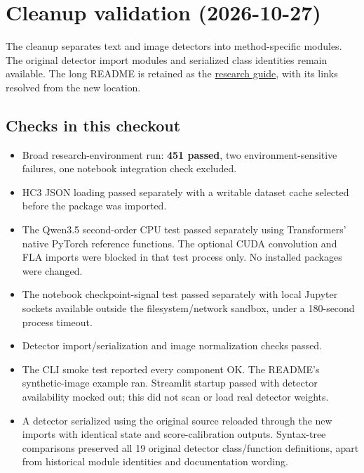 \section{Cleanup validation
(2026-10-27)}\label{record-docs-cleanup-validation-md-cleanup-validation-2026-10-27}

The cleanup separates text and image detectors into method-specific
modules. The original detector import modules and serialized class
identities remain available. The long README is retained as the
\href{records/docs/research_guide.tex}{research guide}, with its links
resolved from the new location.

\subsection{Checks in this
checkout}\label{record-docs-cleanup-validation-md-checks-in-this-checkout}

\begin{itemize}
\tightlist
\item
  Broad research-environment run: \textbf{451 passed}, two
  environment-sensitive failures, one notebook integration check
  excluded.
\item
  HC3 JSON loading passed separately with a writable dataset cache
  selected before the \texttt{} package was imported.
\item
  The Qwen3.5 second-order CPU test passed separately using
  Transformers' native PyTorch reference functions. The optional CUDA
  convolution and FLA imports were blocked in that test process only. No
  installed packages were changed.
\item
  The notebook checkpoint-signal test passed separately with local
  Jupyter sockets available outside the filesystem/network sandbox,
  under a 180-second process timeout.
\item
  Detector import/serialization and image normalization checks passed.
\item
  The CLI smoke test reported every component OK. The README's
  synthetic-image example ran. Streamlit startup passed with detector
  availability mocked out; this did not scan or load real detector
  weights.
\item
  A detector serialized using the original source reloaded through the
  new imports with identical state and score-calibration outputs.
  Syntax-tree comparisons preserved all 19 original detector
  class/function definitions, apart from historical module identities
  and documentation wording.
\end{itemize}

